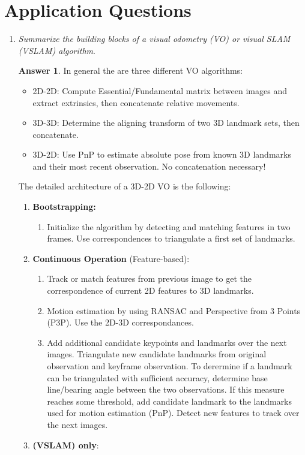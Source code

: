 \documentclass[a4paper,12 pt]{article}
\theoremstyle{definition}
\theoremstyle{remark}
\theoremstyle{definition}
\theoremstyle{definition}
\theoremstyle{definition}
\theoremstyle{definition}
\theoremstyle{remark}
\theoremstyle{remark}
\theoremstyle{definition}
\theoremstyle{definition}
\newtheorem*{answer}{Answer}
\begin{document}
\section*{Application Questions}
\begin{enumerate}
\item \textit{Summarize the building blocks of a visual odometry (VO) or visual SLAM (VSLAM) algorithm}.
\begin{answer}
In general the are three different VO algorithms:
\begin{itemize}
\item 2D-2D: Compute Essential/Fundamental matrix between images and extract extrinsics, then concatenate relative movements.
\item 3D-3D: Determine the aligning transform of two 3D landmark sets, then concatenate.
\item 3D-2D: Use PnP to estimate absolute pose from known 3D landmarks and their most recent observation. No concatenation necessary!
\end{itemize}
The detailed architecture of a 3D-2D VO is the following:
\begin{enumerate}
\item \textbf{Bootstrapping:}
\begin{enumerate}
\item Initialize the algorithm by detecting and matching features in two frames. Use correspondences to triangulate a first set of landmarks.
\end{enumerate}
\item \textbf{Continuous Operation} (Feature-based):
\begin{enumerate}
\item Track or match features from previous image to get the correspondence of current 2D features to 3D landmarks.
\item Motion estimation by using RANSAC and Perspective from 3 Points (P3P). Use the 2D-3D correspondances.
\item Add additional candidate keypoints and landmarks over the next images. Triangulate new candidate landmarks from original observation and keyframe observation. To derermine if a landmark can be triangulated with sufficient accuracy, determine base line/bearing angle between the two observations. If this measure reaches some threshold, add candidate landmark to the landmarks used for motion estimation (PnP). Detect new features to track over the next images.
\end{enumerate}
\item \textbf{(VSLAM) only}:

\end{enumerate}
\end{answer}
\end{enumerate}
\end{document}
